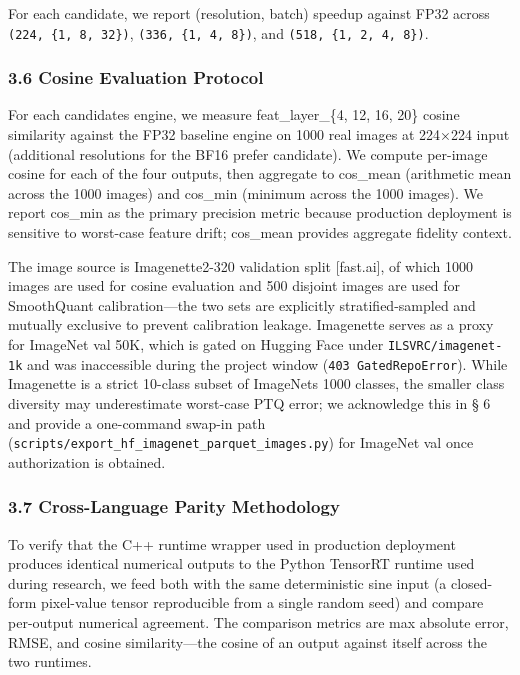 \documentclass[
]{article}
\begin{document}
For each candidate, we report (resolution, batch) speedup against FP32
across \texttt{(224,\ \{1,\ 8,\ 32\})}, \texttt{(336,\ \{1,\ 4,\ 8\})},
and \texttt{(518,\ \{1,\ 2,\ 4,\ 8\})}.

\subsubsection{3.6 Cosine Evaluation
Protocol}\label{36-cosine-evaluation-protocol}

For each candidate\textquotesingle s engine, we measure
feat\_layer\_\{4, 12, 16, 20\} cosine similarity against the FP32
baseline engine on 1000 real images at 224×224 input (additional
resolutions for the BF16 prefer candidate). We compute per-image cosine
for each of the four outputs, then aggregate to cos\_mean (arithmetic
mean across the 1000 images) and cos\_min (minimum across the 1000
images). We report cos\_min as the primary precision metric because
production deployment is sensitive to worst-case feature drift;
cos\_mean provides aggregate fidelity context.

The image source is Imagenette2-320 validation split {[}fast.ai{]}, of
which 1000 images are used for cosine evaluation and 500 disjoint images
are used for SmoothQuant calibration---the two sets are explicitly
stratified-sampled and mutually exclusive to prevent calibration
leakage. Imagenette serves as a proxy for ImageNet val 50K, which is
gated on Hugging Face under \texttt{ILSVRC/imagenet-1k} and was
inaccessible during the project window (\texttt{403\ GatedRepoError}).
While Imagenette is a strict 10-class subset of
ImageNet\textquotesingle s 1000 classes, the smaller class diversity may
underestimate worst-case PTQ error; we acknowledge this in § 6 and
provide a one-command swap-in path
(\texttt{scripts/export\_hf\_imagenet\_parquet\_images.py}) for ImageNet
val once authorization is obtained.

\subsubsection{3.7 Cross-Language Parity
Methodology}\label{37-cross-language-parity-methodology}

To verify that the C++ runtime wrapper used in production deployment
produces identical numerical outputs to the Python TensorRT runtime used
during research, we feed both with the same deterministic sine input (a
closed-form pixel-value tensor reproducible from a single random seed)
and compare per-output numerical agreement. The comparison metrics are
max absolute error, RMSE, and cosine similarity---the cosine of an
output against itself across the two runtimes.
\end{document}
